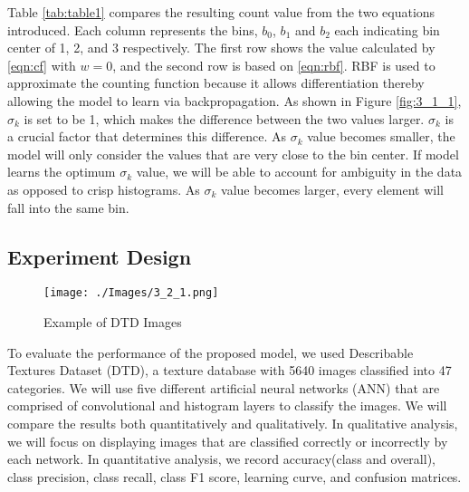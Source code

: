 \documentclass[10pt,twocolumn,letterpaper]{article}
\begin{document}
Table \ref{tab:table1} compares the resulting count value from the two equations introduced. Each column represents the bins, $b_0$, $b_1$ and $b_2$ each indicating bin center of 1, 2, and 3 respectively. The first row shows the value calculated by \eqref{eqn:cf} with $w = 0$, and the second row is based on \eqref{eqn:rbf}. RBF is used to approximate the counting function because it allows differentiation thereby allowing the model to learn via backpropagation. As shown in Figure \ref{fig:3_1_1}, $\sigma_k$ is set to be 1, which makes the difference between the two values larger. $\sigma_k$ is a crucial factor that determines this difference. As $\sigma_k$ value becomes smaller, the model will only consider the values that are very close to the bin center. If model learns the optimum $\sigma_k$ value, we will be able to account for ambiguity in the data as opposed to crisp histograms. As $\sigma_k$ value becomes larger, every element will fall into the same bin.

\subsection{Experiment Design}

\begin{figure}[H]
	\texttt{[image: ./Images/3\_2\_1.png]}
	\caption{Example of DTD Images \cite{cimpoi14DTD}}
	\label{fig:3_2_1}
\end{figure}

To evaluate the performance of the proposed model, we used Describable Textures Dataset (DTD), a texture database with 5640 images classified into 47 categories. We will use five different artificial neural networks (ANN) that are comprised of convolutional and histogram layers to classify the images. We will compare the results both quantitatively and qualitatively. In qualitative analysis, we will focus on displaying images that are classified correctly or incorrectly by each network. In quantitative analysis, we record accuracy(class and overall), class precision, class recall, class F1 score, learning curve, and confusion matrices.


\vfill\null

{\small


}
\end{document}
